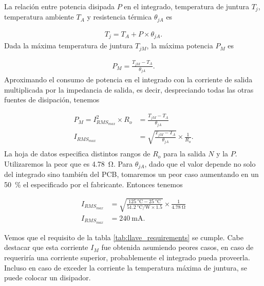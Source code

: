 La relación entre potencia disipada $P$ en el integrado, temperatura de juntura
$T_j$, temperatura ambiente $T_A$ y resistencia térmica $\theta_{jA}$ es

\begin{equation}
    \begin{aligned}
        T_{j} = T_{A} + P \times \theta_{jA}.
    \end{aligned}
\end{equation}
Dada la máxima temperatura de juntura $T_{jM}$, la máxima potencia $P_M$ es

\begin{equation}
    \begin{aligned}
        P_{M} = \frac{T_{jM}-T_A}{\theta_{jA}}.
    \end{aligned}
\end{equation}
Aproximando el consumo de potencia en el integrado con la corriente de salida
multiplicada por la impedancia de salida, es decir, despreciando todas las otras
fuentes de disipación, tenemos

\begin{equation}
    \begin{aligned}
        P_{M} = I_{RMS_{max}}^2 \times R_o &= \frac{T_{jM}-T_A}{\theta_{jA}} \\
        I_{RMS_{max}} &= \sqrt{\frac{T_{jM}-T_A}{\theta_{jA}}} \times
        \frac{1}{R_o}. \\
    \end{aligned}
\end{equation}
La hoja de datos especifica distintos rangos de $R_o$ para la salida $N$ y la
$P$. Utilizaremos la peor que es \qty{4.78}{\ohm}. Para $\theta_{jA}$, dado que
el valor depende no solo del integrado sino también del PCB, tomaremos un peor
caso aumentando en un \qty{50}{\percent} el especificado por el fabricante.
Entonces tenemos

\begin{equation}
    \begin{aligned}
        I_{RMS_{max}} &= \sqrt{\frac{ \qty{125}{\celsius}-
        \qty{25}{\celsius}}{\qty[per-mode=fraction]{51.2}{\celsius\per\watt}
        \times 1.5 }} \times \frac{1}{ \qty{4.78}{\ohm} } \\
        I_{RMS_{max}} &= \qty{240}{\milli\ampere}.
    \end{aligned}
\end{equation}

Vemos que el requisito de la tabla \ref{tab:llave_requirements} se cumple. Cabe
destacar que esta corriente $I_M$ fue obtenida asumiendo peores casos, en caso
de requeriría una corriente superior, probablemente el integrado pueda
proveerla. Incluso en caso de exceder la corriente la temperatura máxima de
juntura, se puede colocar un disipador.

